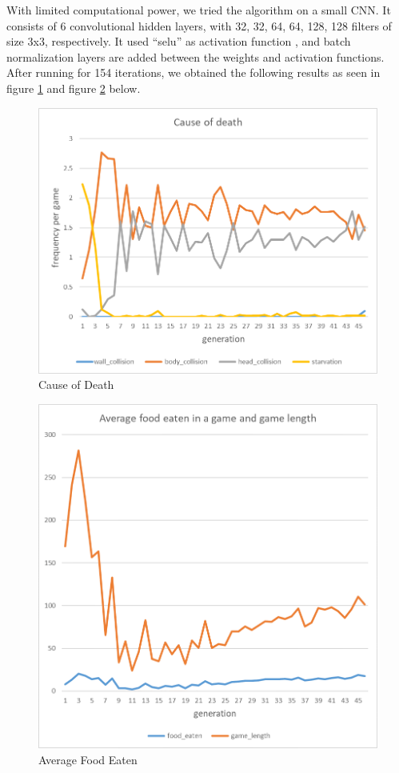 \documentclass{article}
\begin{document}
With limited computational power, we tried the algorithm on a small CNN. It
consists of 6 convolutional hidden layers, with 32, 32, 64, 64, 128, 128 filters
of size 3x3, respectively. It used “selu” as activation function
\cite{SeluPaper}, and batch normalization layers are added between the weights
and activation functions. After running for 154 iterations, we obtained the
following results as seen in figure \ref{fig:cause_of_death} and figure
\ref{fig:average_food_eaten} below.

\begin{figure}[!ht]
  \centering
  \includegraphics[width=\linewidth]{cause_of_death}
  \caption{Cause of Death}
  \label{fig:cause_of_death}
\end{figure}

\FloatBarrier

\begin{figure}[!ht]
  \centering
  \includegraphics[width=\linewidth]{average_food_eaten}
  \caption{Average Food Eaten}
  \label{fig:average_food_eaten}
\end{figure}
\end{document}
